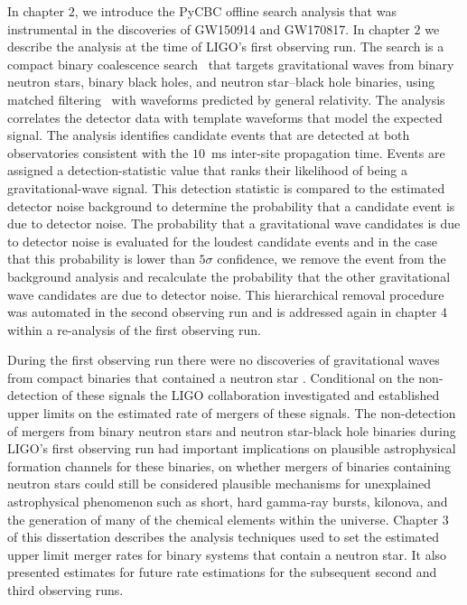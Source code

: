 In chapter $2$, we introduce the PyCBC offline search analysis that was instrumental in the discoveries of GW150914 and GW170817. In chapter $2$ we describe the analysis at the time of LIGO's first observing run. The \pycbc{} search is a compact binary coalescence search~\cite{thorne.k:1987,Sathyaprakash:1991mt,Cutler:1992tc,Finn:1992wt,Finn:1992xs,Dhurandhar:1992mw,Balasubramanian:1995bm,Flanagan:1997sx} that targets gravitational waves from binary neutron stars, binary black holes, and neutron star--black hole binaries, using matched filtering~\cite{wainstein:1962} with waveforms predicted by general relativity.  The \pycbc{} analysis correlates the detector data with template waveforms that model the expected signal. The analysis identifies candidate events that are detected at both observatories consistent with the $10$~ms inter-site propagation time. Events are assigned a detection-statistic value that ranks their likelihood of being a gravitational-wave signal. This detection statistic is compared to the estimated detector noise background to determine the probability that a candidate event is due to detector noise. The probability that a gravitational wave candidates is due to detector noise is evaluated for the loudest candidate events and in the case that this probability is lower than $5 \sigma$ confidence, we remove the event from the background analysis and recalculate the probability that the other gravitational wave candidates are due to detector noise. This hierarchical removal procedure was automated in the second observing run and is addressed again in chapter 4 within a re-analysis of the first observing run.

During the first observing run there were no discoveries of gravitational waves from compact binaries that contained a neutron star \cite{O1BBH}. Conditional on the non-detection of these signals the LIGO collaboration investigated and established upper limits on the estimated rate of mergers of these signals. The non-detection of mergers from binary neutron stars and neutron star-black hole binaries during LIGO's first observing run had important implications on plausible astrophysical formation channels for these binaries, on whether mergers of binaries containing neutron stars could still be considered plausible mechanisms for unexplained astrophysical phenomenon such as short, hard gamma-ray bursts, kilonova, and the generation of many of the chemical elements within the universe. Chapter 3 of this dissertation describes the analysis techniques used to set the estimated upper limit merger rates for binary systems that contain a neutron star. It also presented estimates for future rate estimations for the subsequent second and third observing runs.

